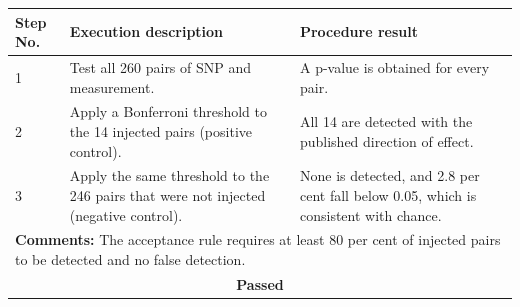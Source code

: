 \begin{table}[H]
\begin{tabular}{|llll|}
\multicolumn{1}{|l|}{\textbf{Step No.}} & \multicolumn{1}{l|}{\textbf{Execution description}} & \multicolumn{2}{l|}{\textbf{Procedure result}} \\ \hline
\multicolumn{1}{|l|}{1} & \multicolumn{1}{P{5.6cm}|}{Test all 260 pairs of SNP and measurement.} & \multicolumn{2}{P{6.3cm}|}{A p-value is obtained for every pair.} \\ \hline
\multicolumn{1}{|l|}{2} & \multicolumn{1}{P{5.6cm}|}{Apply a Bonferroni threshold to the 14 injected pairs (positive control).} & \multicolumn{2}{P{6.3cm}|}{All 14 are detected with the published direction of effect.} \\ \hline
\multicolumn{1}{|l|}{3} & \multicolumn{1}{P{5.6cm}|}{Apply the same threshold to the 246 pairs that were not injected (negative control).} & \multicolumn{2}{P{6.3cm}|}{None is detected, and 2.8 per cent fall below 0.05, which is consistent with chance.} \\ \hline
\multicolumn{4}{|P{15.2cm}|}{\textbf{Comments:} The acceptance rule requires at least 80 per cent of injected pairs to be detected and no false detection.} \\ \hline
\multicolumn{4}{|c|}{\textbf{Passed}} \\ \hline
\end{tabular}
\end{table}


